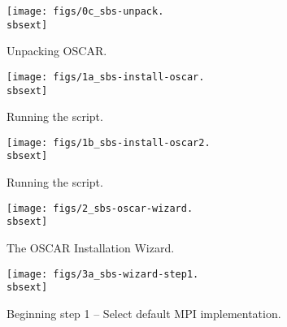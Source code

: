 \begin{figure}[htbp]
  \begin{center}
    \texttt{[image: figs/0c\_sbs-unpack.\\sbsext]}
    \caption{Unpacking OSCAR.}
    \label{fig:sbs-unpacking-oscar}
  \end{center}
\end{figure}


\begin{figure}[htbp]
  \begin{center}
    \texttt{[image: figs/1a\_sbs-install-oscar.\\sbsext]}
    \caption{Running the  script.}
    \label{fig:sbs-install-oscar}
  \end{center}
\end{figure}

\begin{figure}[htbp]
  \begin{center}
    \texttt{[image: figs/1b\_sbs-install-oscar2.\\sbsext]}
    \caption{Running the  script.}
    \label{fig:sbs-install-oscar2}
  \end{center}
\end{figure}


\begin{figure}[htbp]
  \begin{center}
    \texttt{[image: figs/2\_sbs-oscar-wizard.\\sbsext]}
    \caption{The OSCAR Installation Wizard.}
    \label{fig:sbs-install-wizard}
  \end{center}
\end{figure}




\begin{figure}[htbp]
  \begin{center}
    \texttt{[image: figs/3a\_sbs-wizard-step1.\\sbsext]}
    \caption{Beginning step 1 -- Select default MPI implementation.}
    \label{fig:sbs-install-wizard-s1}
  \end{center}
\end{figure}

